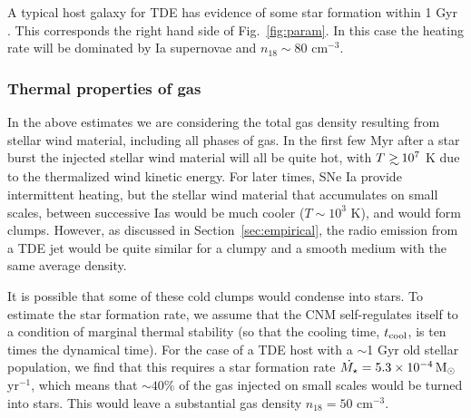 \documentclass[usenatbib,fleqn]{mnras}
\newcommand\gsim{\mathrel{\rlap{\lower4pt\hbox{\hskip1pt$\sim$}}
    \raise1pt\hbox{$>$}}}
\newcommand{\Msun}{{\rm M_\odot}}
\begin{document}
A typical host galaxy for TDE has evidence of some star formation
within 1 Gyr \citep{French+2016}. This corresponds the right hand side
of Fig.~\ref{fig:param}. In this case the heating rate will be
dominated by Ia supernovae and $n_{18}\sim 80$ cm$^{-3}$.

\subsubsection{Thermal properties of gas}

In the above estimates we are considering the total gas density
resulting from stellar wind material, including all phases of gas. In
the first few Myr after a star burst the injected stellar wind
material will all be quite hot, with $T\gsim 10^{7}$ K due to the
thermalized wind kinetic energy. For later times, SNe Ia provide
intermittent heating, but the stellar wind material that accumulates
on small scales, between successive Ias would be much cooler ($T\sim
10^{3}$ K), and would form clumps. However, as discussed in
Section~\ref{sec:empirical}, the radio emission from a TDE jet would
be quite similar for a clumpy and a smooth medium with the same
average density.

It is possible that some of these cold clumps would condense into
stars. To estimate the star formation rate, we assume that the CNM
self-regulates itself to a condition of marginal thermal
stability (so that the cooling time, $t_{\rm cool}$, is ten times the
dynamical time). For the case of a TDE host with a $\sim$1 Gyr old stellar
population, we find that this requires a star formation rate $\dot{M_\star}
=5.3 \times 10^{-4} \,\Msun$ yr$^{-1}$, which means that $\sim 40$\% of
the gas injected on small scales would be turned into stars. This
would leave a substantial gas density $n_{18}=50$ cm$^{-3}$.   
\end{document}
